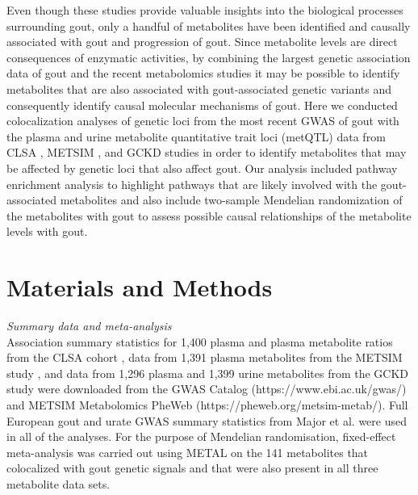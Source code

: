 \documentclass[gucdd,article,submit,pdftex,moreauthors]{Definitions/mdpi}
\begin{document}
Even though these studies provide valuable insights into the biological processes surrounding gout, only a handful of metabolites have been identified and causally associated with gout and progression of gout.
Since metabolite levels are direct consequences of enzymatic activities, by combining the largest genetic association data of gout \citep{major_genome-wide_2024} and the recent metabolomics studies \citep{chen_genomic_2023,yin_genome-wide_2022,schlosser_genetic_2023} it may be possible to identify metabolites that are also associated with gout-associated genetic variants and consequently identify causal molecular mechanisms of gout.
Here we conducted colocalization analyses of genetic loci from the most recent GWAS of gout \citep{major_genome-wide_2024} with the plasma and urine metabolite quantitative trait loci (metQTL) data from CLSA \citep{chen_genomic_2023}, METSIM \citep{yin_genome-wide_2022}, and GCKD \citep{schlosser_genetic_2023} studies in order to identify meta\-bolites that may be affected by genetic loci that also affect gout.
Our analysis included pathway enrichment analysis to highlight pathways that are likely involved with the gout-associated metabolites and also include two-sample Mendelian randomization of the metabolites with gout to assess possible causal relationships of the metabolite levels with gout.

\section{Materials and Methods}

\noindent
\textit{Summary data and meta-analysis}\\
Association summary statistics for 1,400 plasma and plasma metabolite ratios from the CLSA cohort \citep{chen_genomic_2023}, data from 1,391 plasma metabolites from the METSIM study \citep{yin_genome-wide_2022}, and data from 1,296 plasma and 1,399 urine metabolites from the GCKD study \citep{schlosser_genetic_2023} were downloaded from the GWAS Catalog (https://www.ebi.ac.uk/gwas/) and METSIM Metabolomics PheWeb (https://pheweb.org/metsim-metab/).
Full European gout and urate GWAS summary statistics from Major et al. \citep{major_genome-wide_2024} were used in all of the analyses.
For the purpose of Mendelian randomisation, fixed-effect meta-analysis was carried out using METAL \citep{willer_metal_2010} on the 141 metabolites that colocalized with gout genetic signals and that were also present in all three metabolite data sets.
\\
\end{document}
